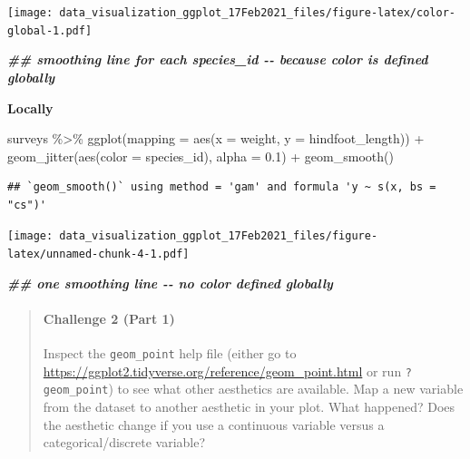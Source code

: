 \documentclass[
]{article}
\newenvironment{Shaded}{\begin{snugshade}}{\end{snugshade}}
\newcommand{\AttributeTok}[1]{\textcolor[rgb]{0.77,0.63,0.00}{#1}}
\newcommand{\DocumentationTok}[1]{\textcolor[rgb]{0.56,0.35,0.01}{\textbf{\textit{#1}}}}
\newcommand{\FloatTok}[1]{\textcolor[rgb]{0.00,0.00,0.81}{#1}}
\newcommand{\FunctionTok}[1]{\textcolor[rgb]{0.00,0.00,0.00}{#1}}
\newcommand{\NormalTok}[1]{#1}
\newcommand{\SpecialCharTok}[1]{\textcolor[rgb]{0.00,0.00,0.00}{#1}}
\begin{document}
\texttt{[image: data\_visualization\_ggplot\_17Feb2021\_files/figure-latex/color-global-1.pdf]}

\begin{Shaded}
\begin{Highlighting}[]
\DocumentationTok{\#\# smoothing line for each species\_id {-}{-} because color is defined globally}
\end{Highlighting}
\end{Shaded}

\textbf{Locally}

\begin{Shaded}
\begin{Highlighting}[]
\NormalTok{surveys }\SpecialCharTok{\%\textgreater{}\%} 
  \FunctionTok{ggplot}\NormalTok{(}\AttributeTok{mapping =} \FunctionTok{aes}\NormalTok{(}\AttributeTok{x =}\NormalTok{ weight, }\AttributeTok{y =}\NormalTok{ hindfoot\_length)) }\SpecialCharTok{+}
  \FunctionTok{geom\_jitter}\NormalTok{(}\FunctionTok{aes}\NormalTok{(}\AttributeTok{color =}\NormalTok{ species\_id), }\AttributeTok{alpha =} \FloatTok{0.1}\NormalTok{) }\SpecialCharTok{+} 
  \FunctionTok{geom\_smooth}\NormalTok{()}
\end{Highlighting}
\end{Shaded}

\begin{verbatim}
## `geom_smooth()` using method = 'gam' and formula 'y ~ s(x, bs = "cs")'
\end{verbatim}

\texttt{[image: data\_visualization\_ggplot\_17Feb2021\_files/figure-latex/unnamed-chunk-4-1.pdf]}

\begin{Shaded}
\begin{Highlighting}[]
\DocumentationTok{\#\# one smoothing line {-}{-} no color defined globally}
\end{Highlighting}
\end{Shaded}

\begin{quote}
\mbox{}%
\hypertarget{challenge-2-part-1}{%
\paragraph{Challenge 2 (Part 1)}\label{challenge-2-part-1}}

Inspect the \texttt{geom\_point} help file (either go to
\url{https://ggplot2.tidyverse.org/reference/geom_point.html} or run
\texttt{?geom\_point}) to see what other aesthetics are available. Map a
new variable from the dataset to another aesthetic in your plot. What
happened? Does the aesthetic change if you use a continuous variable
versus a categorical/discrete variable?
\end{quote}
\end{document}
